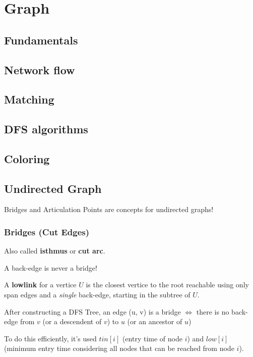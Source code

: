 \chapter{Graph}

\section{Fundamentals}

\section{Network flow}

\section{Matching}

\section{DFS algorithms}

\section{Coloring}

\section{Undirected Graph}

	Bridges and Articulation Points are concepts for undirected graphs!
	
	\subsection{Bridges (Cut Edges)}

		Also called \textbf{isthmus} or \textbf{cut arc}.
		
		A back-edge is never a bridge!
		
		A \textbf{lowlink} for a vertice $U$ is the closest vertice to the root reachable using only span edges and a \textit{single} back-edge, starting in the subtree of $U$.
		
		After constructing a DFS Tree, an edge (u, v) is a bridge $\iff$ there is no back-edge from $v$ (or a descendent of $v$) to $u$ (or an ancestor of $u$)
		
		To do this efficiently, it's used $tin[i]$ (entry time of node $i$) and $low[i]$ (minimum entry time considering all nodes that can be reached from node $i$).
		
